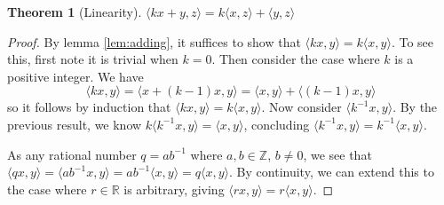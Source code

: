 \documentclass{article}
\newcommand{\R}{\mathbb{R}}
\newcommand{\Z}{\mathbb{Z}}
\newcommand{\inner}[1]{\langle #1\rangle}
\newtheorem{theorem}{Theorem}
\begin{document}
\begin{theorem}[Linearity]
  $\inner{kx+y,z}=k\inner{x,z}+\inner{y,z}$
\end{theorem}
\begin{proof}
  By lemma \ref{lem:adding}, it suffices to show that $\inner{kx,y}=k\inner{x,y}$. To see this, first note it is trivial when $k=0$. Then consider the case where $k$ is a positive integer. We have 
  \[
  \inner{kx,y}=\inner{x+(k-1)x,y}=\inner{x,y}+\inner{(k-1)x,y}
  \]
  so it follows by induction that $\inner{kx,y}=k\inner{x,y}$. Now consider $\inner{k^{-1}x,y}$. By the previous result, we know $k\inner{k^{-1}x,y}=\inner{x,y}$, concluding $\inner{k^{-1}x,y}=k^{-1}\inner{x,y}$.

  As any rational number $q=ab^{-1}$ where $a,b\in\Z$, $b\neq 0$, we see that $\inner{qx,y}=\inner{ab^{-1}x,y}=ab^{-1}\inner{x,y}=q\inner{x,y}$. By continuity, we can extend this to the case where $r\in\R$ is arbitrary, giving $\inner{rx,y}=r\inner{x,y}$.
\end{proof}
\end{document}
